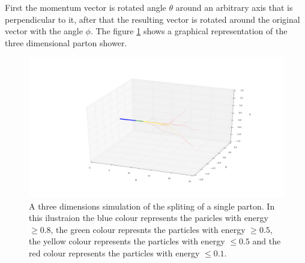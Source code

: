 First the momentum vector is rotated angle $\theta$ around an arbitrary axis that is perpendicular to it, after that the resulting vector is rotated around the original vector with the angle $\phi$.  
The figure \ref{fig:3dparton} shows a graphical representation of the three dimensional parton shower. 

%
%
% 
\begin{figure}[H]
\centering
\includegraphics[scale=.3]{images/3D_partonshower.png}
\caption{A three dimensions simulation of the spliting of a single parton. In this ilustraion the blue colour represents the paricles with energy $\geq 0.8$, the green colour represnts the particles with energy $\geq 0.5$, the yellow colour represents the particles with energy $\leq 0.5$ and the red colour represents the particles with energy $\leq 0.1$.}\label{fig:3dparton}
\end{figure}
%
